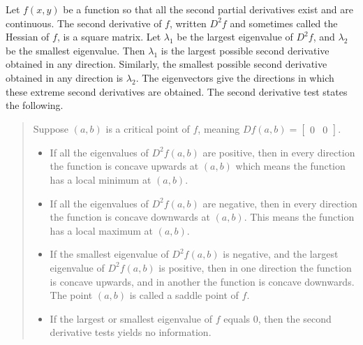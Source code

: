 \begin{theorem}
Let $f(x,y)$ be a function so that all the second partial derivatives exist and are continuous. The second derivative of $f$, written $D^2f$ and sometimes called the Hessian of $f$, is a square matrix. Let $\lambda_1$ be the largest eigenvalue of $D^2f$, and $\lambda_2$ be the smallest eigenvalue. Then $\lambda_1$ is the largest possible second derivative obtained in any direction. Similarly, the smallest possible second derivative obtained in any direction is $\lambda_2$. The eigenvectors give the directions in which these extreme second derivatives are obtained.  The second derivative test states the following.
\begin{quote}
Suppose $(a,b)$ is a critical point of $f$, meaning $Df(a,b) = \begin{bmatrix}0&0\end{bmatrix}$.  
\begin{itemize}
 \item If all the eigenvalues of $D^2f(a,b)$ are positive, then in every direction the function is concave upwards at $(a,b)$ which means the function has a local minimum at $(a,b)$. 
 \item If all the eigenvalues of $D^2f(a,b)$ are negative, then in every direction the function is concave downwards at $(a,b)$. This means the function has a local maximum at $(a,b)$. 
 \item If the smallest eigenvalue of $D^2f(a,b)$ is negative, and the largest eigenvalue of $D^2f(a,b)$ is positive, then  in one direction the function is concave upwards, and in another the function is concave downwards. The point $(a,b)$ is called a saddle point of $f$.
 \item If the largest or smallest eigenvalue of $f$ equals 0, then the second derivative tests yields no information. 
\end{itemize}
 
\end{quote}
  
 
\end{theorem}



